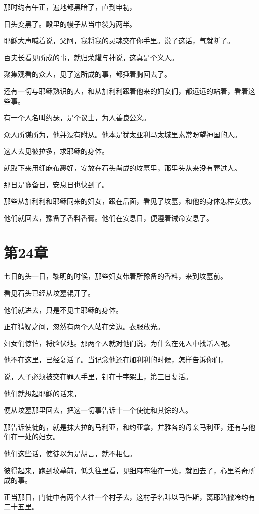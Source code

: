 \documentclass[12pt,oneside]{book}
\begin{document}
那时约有午正，遍地都黑暗了，直到申初，

日头变黑了。殿里的幔子从当中裂为两半。

耶稣大声喊着说，父阿，我将我的灵魂交在你手里。说了这话，气就断了。

百夫长看见所成的事，就归荣耀与神说，这真是个义人。

聚集观看的众人，见了这所成的事，都捶着胸回去了。

还有一切与耶稣熟识的人，和从加利利跟着他来的妇女们，都远远的站着，看着这些事。

有一个人名叫约瑟，是个议士，为人善良公义。

众人所谋所为，他并没有附从。他本是犹太亚利马太城里素常盼望神国的人。

这人去见彼拉多，求耶稣的身体。

就取下来用细麻布裹好，安放在石头凿成的坟墓里，那里头从来没有葬过人。

那日是豫备日，安息日也快到了。

那些从加利利和耶稣同来的妇女，跟在后面，看见了坟墓，和他的身体怎样安放。

他们就回去，豫备了香料香膏。他们在安息日，便遵着诫命安息了。

\chapter{第24章}
七日的头一日，黎明的时候，那些妇女带着所豫备的香料，来到坟墓前。

看见石头已经从坟墓辊开了。

他们就进去，只是不见主耶稣的身体。

正在猜疑之间，忽然有两个人站在旁边。衣服放光。

妇女们惊怕，将脸伏地。那两个人就对他们说，为什么在死人中找活人呢。

他不在这里，已经复活了。当记念他还在加利利的时候，怎样告诉你们，

说，人子必须被交在罪人手里，钉在十字架上，第三日复活。

他们就想起耶稣的话来，

便从坟墓那里回去，把这一切事告诉十一个使徒和其馀的人。

那告诉使徒的，就是抹大拉的马利亚，和约亚拿，并雅各的母亲马利亚，还有与他们在一处的妇女。

他们这些话，使徒以为是胡言，就不相信。

彼得起来，跑到坟墓前，低头往里看，见细麻布独在一处，就回去了，心里希奇所成的事。

正当那日，门徒中有两个人往一个村子去，这村子名叫以马忤斯，离耶路撒冷约有二十五里。
\end{document}
